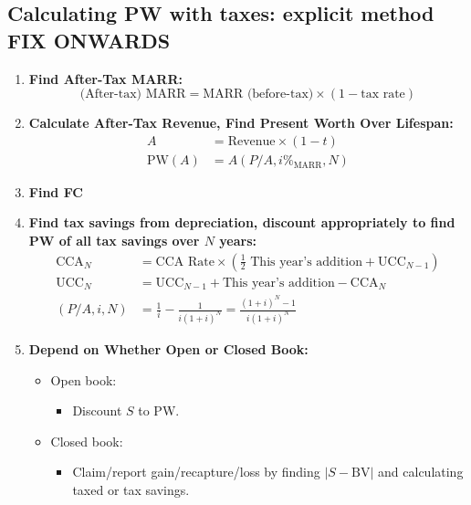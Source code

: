 \subsection{Calculating PW with taxes: explicit method FIX ONWARDS}
\begin{process}
    \begin{enumerate}
        \item \textbf{Find After-Tax MARR:}
        \begin{equation}
            \text{(After-tax) MARR} = \text{MARR (before-tax)} \times (1 - \text{tax rate})
        \end{equation}
        \vspace{1em}
    
        \item \textbf{Calculate After-Tax Revenue, Find Present Worth Over Lifespan:}
        \begin{align}
            A &= \text{Revenue} \times (1 - t) \\
            \text{PW}(A) &= A \left( P/A, i\%_{\text{MARR}}, N \right)
        \end{align}
        \vspace{1em}

        \item \textbf{Find FC}
        \vspace{1em}
    
        \item \textbf{Find tax savings from depreciation, discount appropriately to find PW of all tax savings over \(N\) years:}
        \begin{align}
            \text{CCA}_N &= \text{CCA Rate} \times \left( \frac{1}{2} \text{ This year's addition} + \text{UCC}_{N-1} \right) \\
            \text{UCC}_N &= \text{UCC}_{N-1} + \text{This year's addition} - \text{CCA}_N \\
            (P/A, i, N) &= \frac{1}{i} - \frac{1}{i(1+i)^N} = \frac{(1+i)^N - 1}{i(1+i)^N}
        \end{align}
        \vspace{1em}
    
        \item \textbf{Depend on Whether Open or Closed Book:}
        \begin{itemize}
            \item Open book:
            \begin{itemize}
                \item Discount \(S\) to PW.
            \end{itemize}
            \item Closed book:
            \begin{itemize}
                \item Claim/report gain/recapture/loss by finding \(\left| S - \text{BV} \right|\) and calculating taxed or tax savings.
            \end{itemize}
        \end{itemize}
        \vspace{1em}


\end{enumerate}
\end{process}
